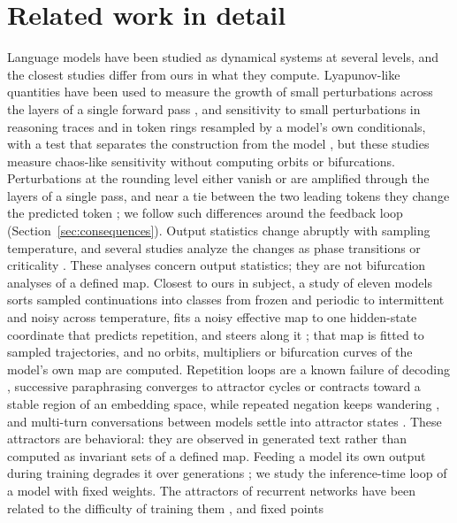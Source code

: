 \documentclass[11pt,letterpaper]{article}
\begin{document}
\section{Related work in detail}
\label{sec:related}
Language models have been studied as dynamical systems at several levels, and
the closest studies differ from ours in what they compute. Lyapunov-like quantities have been used to measure
the growth of small perturbations across the layers of a single forward pass \cite{li2025quasilyapunov}, and
sensitivity to small perturbations in reasoning traces \cite{jaca2026chaos} and in token rings
resampled by a model's own conditionals, with a test that separates the construction from the model
\cite{verazuniga2026selffeeding}, but these studies
measure chaos-like sensitivity without computing orbits or bifurcations. Perturbations at the rounding level either
vanish or are amplified through the layers of a single pass, and near a tie between the two leading tokens they change
the predicted token \cite{islam2026numerical}; we follow such differences around the feedback loop
(Section~\ref{sec:consequences}). Output statistics change
abruptly with sampling temperature, and several studies analyze the changes as phase transitions or criticality
\cite{arnold2024phase,nakaishi2024phase,sun2025phase,ruan2026criticality}. These analyses concern output statistics;
they are not bifurcation analyses of a defined map. Closest to ours in subject, a study of eleven models sorts sampled
continuations into classes from frozen and periodic to intermittent and noisy across temperature, fits a noisy effective map to one
hidden-state coordinate that predicts repetition, and steers along it \cite{johnson2026temperature}; that map is
fitted to sampled trajectories, and no orbits, multipliers or bifurcation curves of the model's own map are computed. Repetition loops are a known failure of
decoding \cite{holtzman2019degeneration,xu2022loop}, successive paraphrasing converges to attractor cycles
\cite{wang2025attractor} or contracts toward a stable region of an embedding space, while repeated negation keeps
wandering \cite{tacheny2025geometric}, and multi-turn conversations between models settle into attractor states
\cite{ko2026attractor}. These attractors are behavioral: they are observed in generated text rather than computed as
invariant sets of a defined map. Feeding a model its own output during training degrades it over generations
\cite{shumailov2024collapse}; we study the inference-time loop of a model with fixed weights. The attractors of
recurrent networks have been related to the difficulty of training them \cite{ribeiro2020attractors}, and fixed points
\end{document}
